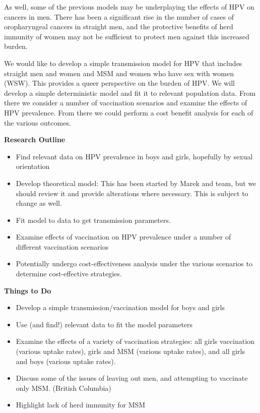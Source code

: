 \documentclass[12pt]{article}
\begin{document}
As well, some of the previous models may be underplaying the effects of HPV on cancers in men.  There has been a significant rise in the number of cases of oropharyngeal cancers in straight men, and the protective benefits of herd immunity of women may not be sufficient to protect men against this increased burden. 

We would like to develop a simple transmission model for HPV that includes straight men and women and MSM and women who have sex with women (WSW).  This provides a queer perspective on the burden of HPV.  We will develop a simple deterministic model and fit it to relevant population data.  From there we consider a number of vaccination scenarios and examine the effects of HPV prevalence.  From there we could perform a cost benefit analysis for each of the various outcomes.  

{\bfseries{Research Outline}}
\begin{itemize}
\item Find relevant data on HPV prevalence in boys and girls, hopefully by sexual orientation
\item Develop theoretical model:  This has been started by Marek and team, but we should review it and provide alterations where necessary.  This is subject to change as well.
\item Fit model to data to get transmission parameters.
\item Examine effects of vaccination on HPV prevalence under a number of different vaccination scenarios
\item Potentially undergo cost-effectiveness analysis under the various scenarios to determine cost-effective strategies.
\end{itemize}



{\bfseries{Things to Do}}
\begin{itemize}
\item Develop a simple transmission/vaccination model for boys and girls
\item Use (and find!) relevant data to fit the model parameters
\item Examine the effects of a variety of vaccination strategies: all girls vaccination (various uptake rates), girls and MSM (various uptake rates), and all girls and boys (various uptake rates).
\item Discuss some of the issues of leaving out men, and attempting to vaccinate only MSM. (British Columbia)
\item Highlight lack of herd immunity for MSM

\end{itemize}

\newpage


\end{document}
